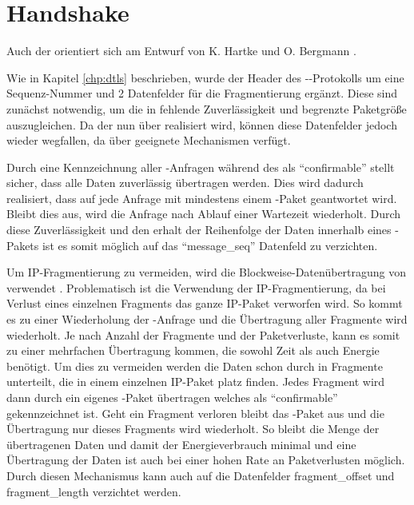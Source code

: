 \section{Handshake}
\label{sec:handshake}

Auch der  orientiert sich am Entwurf von K. Hartke und O. Bergmann \cite[Kapitel 4]{draftcodtls}.

Wie in Kapitel \ref{chp:dtls} beschrieben, wurde der Header des --Protokolls um eine Sequenz-Nummer
und 2 Datenfelder für die Fragmentierung ergänzt. Diese sind zunächst notwendig, um die in  fehlende Zuverlässigkeit
und begrenzte Paketgröße auszugleichen. Da der  nun über  realisiert wird, können diese Datenfelder jedoch
wieder wegfallen, da  über geeignete Mechanismen verfügt.

Durch eine Kennzeichnung aller -Anfragen während des  als "`confirmable"' stellt  sicher, dass
alle Daten zuverlässig übertragen werden. Dies wird dadurch realisiert, dass auf jede Anfrage mit mindestens einem -Paket
geantwortet wird. Bleibt dies aus, wird die Anfrage nach Ablauf einer Wartezeit wiederholt. Durch diese Zuverlässigkeit und den
erhalt der Reihenfolge der Daten innerhalb eines -Pakets ist es somit möglich auf das "`message\_seq"' Datenfeld zu verzichten.

Um IP-Fragmentierung zu vermeiden, wird die Blockweise-Datenübertragung von  verwendet \cite{draftcoapblock}. Problematisch ist die Verwendung
der IP-Fragmentierung, da bei Verlust eines einzelnen Fragments das ganze IP-Paket verworfen wird. So kommt es zu einer Wiederholung
der -Anfrage und die Übertragung aller Fragmente wird wiederholt. Je nach Anzahl der Fragmente und der Paketverluste, kann
es somit zu einer mehrfachen Übertragung kommen, die sowohl Zeit als auch Energie benötigt. Um dies zu vermeiden werden die Daten schon
durch  in Fragmente unterteilt, die in einem einzelnen IP-Paket platz finden. Jedes Fragment wird dann durch ein eigenes
-Paket übertragen welches als "`confirmable"' gekennzeichnet ist. Geht ein Fragment verloren bleibt das -Paket aus
und die Übertragung nur dieses Fragments wird wiederholt. So bleibt die Menge der übertragenen Daten und damit der Energieverbrauch
minimal und eine Übertragung der Daten ist auch bei einer hohen Rate an Paketverlusten möglich. Durch diesen Mechanismus kann auch
auf die Datenfelder fragment\_offset und fragment\_length verzichtet werden.

